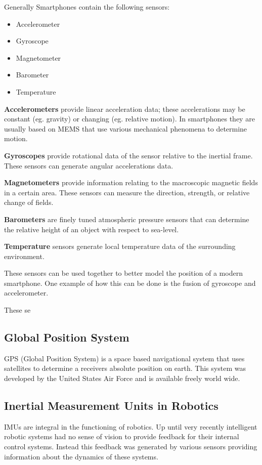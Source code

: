 Generally Smartphones contain the following sensors:
\begin{itemize}
\item Accelerometer
\item Gyroscope
\item Magnetometer
\item Barometer
\item Temperature
\end{itemize}

\textbf{Accelerometers} provide linear acceleration data; these accelerations may be constant (eg. gravity) or changing (eg. relative motion). In smartphones they are usually based on MEMS that use various mechanical phenomena to determine motion. 

\textbf{Gyroscopes} provide rotational data of the sensor relative to the inertial frame.  These sensors can generate angular accelerations data.

\textbf{Magnetometers} provide information relating to the macroscopic magnetic fields in a certain area. These sensors can measure the direction, strength, or relative change of fields. 

\textbf{Barometers} are finely tuned atmospheric pressure sensors that can determine the relative height of an object with respect to sea-level.

\textbf{Temperature} sensors generate local temperature data of the surrounding environment.

These sensors can be used together to better model the position of a modern smartphone. One example of how this can be done is the fusion of gyroscope and accelerometer. 

These se

\subsection{Global Position System}
GPS (Global Position System) is a space based navigational system that uses satellites to determine a receivers absolute position on earth. This system was developed by the United States Air Force and is available freely world wide. 






\subsection{Inertial Measurement Units in Robotics}
IMUs are integral in the functioning of robotics. Up until very recently intelligent robotic systems had no sense of vision to provide feedback for their internal control systems. Instead this feedback was generated by various sensors providing information about the dynamics of these systems.






